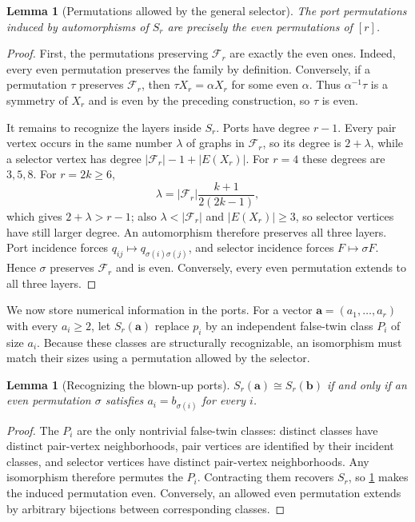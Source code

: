 \documentclass[11pt]{article}
\newtheorem{lemma}[theorem]{Lemma}
\begin{document}
\begin{lemma}[Permutations allowed by the general selector]\label{lem:selector}
The port permutations induced by automorphisms of $S_r$ are precisely the even permutations of $[r]$.
\end{lemma}
\begin{proof}
First, the permutations preserving $\mathcal F_r$ are exactly the even ones. Indeed, every even
permutation preserves the family by definition. Conversely, if a permutation $\tau$ preserves
$\mathcal F_r$, then $\tau X_r=\alpha X_r$ for some even $\alpha$. Thus
$\alpha^{-1}\tau$ is a symmetry of $X_r$ and is even by the preceding construction, so $\tau$ is even.

It remains to recognize the layers inside $S_r$. Ports have degree $r-1$. Every pair vertex occurs in
the same number $\lambda$ of graphs in $\mathcal F_r$, so its degree is $2+\lambda$, while a selector
vertex has degree $|\mathcal F_r|-1+|E(X_r)|$. For $r=4$ these degrees are $3,5,8$. For $r=2k\ge6$,
\[
 \lambda=|\mathcal F_r|\frac{k+1}{2(2k-1)},
\]
which gives $2+\lambda>r-1$; also $\lambda<|\mathcal F_r|$ and $|E(X_r)|\ge3$, so selector vertices
have still larger degree. An automorphism therefore preserves all three layers. Port incidence forces
$q_{ij}\mapsto q_{\sigma(i)\sigma(j)}$, and selector incidence forces $F\mapsto\sigma F$. Hence
$\sigma$ preserves $\mathcal F_r$ and is even. Conversely, every even permutation extends to all three
layers.
\end{proof}

We now store numerical information in the ports. For a vector
$\mathbf a=(a_1,\ldots,a_r)$ with every $a_i\ge2$, let $S_r(\mathbf a)$ replace $p_i$ by an independent
false-twin class $P_i$ of size $a_i$. Because these classes are structurally recognizable, an
isomorphism must match their sizes using a permutation allowed by the selector.

\begin{lemma}[Recognizing the blown-up ports]\label{lem:blowup}
$S_r(\mathbf a)\cong S_r(\mathbf b)$ if and only if an even permutation $\sigma$ satisfies
$a_i=b_{\sigma(i)}$ for every $i$.
\end{lemma}
\begin{proof}
The $P_i$ are the only nontrivial false-twin classes: distinct classes have distinct pair-vertex
neighborhoods, pair vertices are identified by their incident classes, and selector vertices have
distinct pair-vertex neighborhoods. Any isomorphism therefore permutes the $P_i$. Contracting them
recovers $S_r$, so \cref{lem:selector} makes the induced permutation even. Conversely, an allowed even
permutation extends by arbitrary bijections between corresponding classes.
\end{proof}
\end{document}
